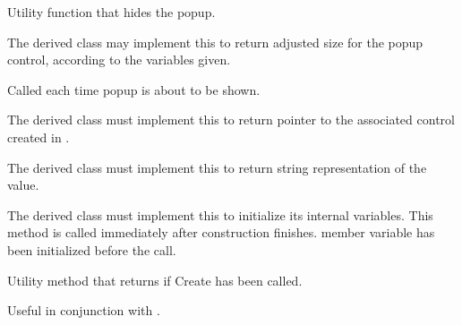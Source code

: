 
Utility function that hides the popup.


\label{wxcombopopupgetadjustedsize}


The derived class may implement this to return adjusted size
for the popup control, according to the variables given.




Called each time popup is about to be shown.


\label{wxcombopopupgetcontrol}


The derived class must implement this to return pointer
to the associated control created in .


\label{wxcombopopupgetstringvalue}


The derived class must implement this to return
string representation of the value.


\label{wxcombopopupinit}


The derived class must implement this to initialize
its internal variables. This method is called immediately
after construction finishes. 
member variable has been initialized before the call.


\label{wxcombopopupiscreated}


Utility method that returns \true if Create has been called.

Useful in conjunction with .


\label{wxcombopopuplazycreate}

